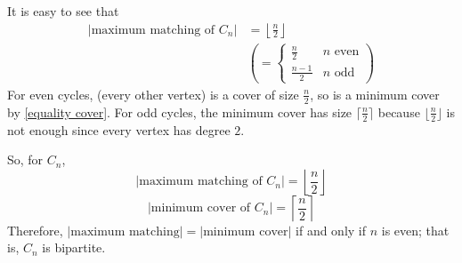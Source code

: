 \begin{center}


\end{center}
It is easy to see that
\begin{align*}
    |\text{maximum matching of }C_n|
     & =\left\lfloor \frac{n}{2} \right\rfloor \\
     & \left( =
    \begin{cases}
            \frac{n}{2}   & n \text{ even} \\
            \frac{n-1}{2} & n \text{ odd}
        \end{cases}\right)
\end{align*}
For even cycles, (every other vertex) is a cover of size $ \frac{n}{2} $, so
is a minimum cover by \ref{equality cover}.
For odd cycles, the minimum cover has size $ \lceil \frac{n}{2} \rceil $
because $ \lfloor \frac{n}{2} \rfloor  $ is not enough since every vertex has
degree $ 2 $.

So, for $ C_n $,
\[ |\text{maximum matching of }C_n|=\left\lfloor \frac{n}{2} \right\rfloor \]
\[ |\text{minimum cover of }C_n|=\left\lceil \frac{n}{2} \right\rceil \]
Therefore, $ |\text{maximum matching}|=|\text{minimum cover}| $ if and only if
$ n $ is even; that is, $ C_n $ is bipartite.

